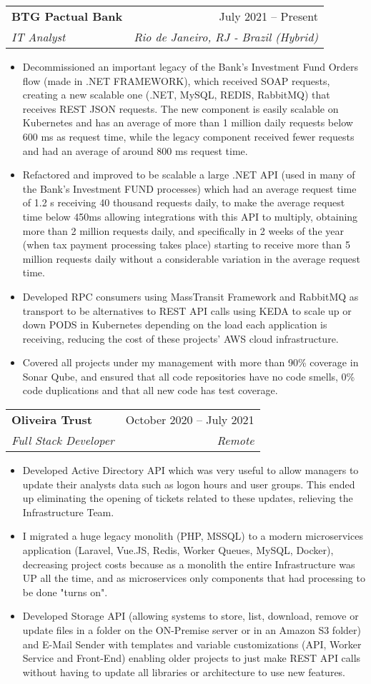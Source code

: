 \documentclass[letterpaper,11pt]{article}
\makeatletter
\newcommand{\resumeItem}[1]{
  \item\small{
    {#1 \vspace{-2pt}}
  }
}
\newcommand{\resumeSubheading}[4]{
  \vspace{-2pt}\item
    \begin{tabular*}{0.97\textwidth}[t]{l@{\extracolsep{\fill}}r}
      \textbf{#1} & #2 \\
      \textit{\small#3} & \textit{\small #4} \\
    \end{tabular*}\vspace{-7pt}
}
\newcommand{\resumeItemListStart}{\begin{itemize}}
\newcommand{\resumeItemListEnd}{\end{itemize}\vspace{-5pt}}
\makeatother
\begin{document}
    \resumeSubheading
      {BTG Pactual Bank}{July 2021 -- Present}
      {IT Analyst}{Rio de Janeiro, RJ - Brazil (Hybrid)}
      \resumeItemListStart
        \resumeItem{Decommissioned an important legacy of the Bank's Investment Fund Orders flow (made in .NET FRAMEWORK), which received SOAP requests, creating a new scalable one (.NET, MySQL, REDIS, RabbitMQ) that receives REST JSON requests. The new component is easily scalable on Kubernetes and has an average of more than 1 million daily requests below 600 ms as request time, while the legacy component received fewer requests and had an average of around 800 ms request time.}
        \resumeItem{Refactored and improved to be scalable a large .NET API (used in many of the Bank's Investment FUND processes) which had an average request time of 1.2 s receiving 40 thousand requests daily, to make the average request time below 450ms allowing integrations with this API to multiply, obtaining more than 2 million requests daily, and specifically in 2 weeks of the year (when tax payment processing takes place) starting to receive more than 5 million requests daily without a considerable variation in the average request time.}
        \resumeItem{Developed RPC consumers using MassTransit Framework and RabbitMQ as transport to be alternatives to REST API calls using KEDA to scale up or down PODS in Kubernetes depending on the load each application is receiving, reducing the cost of these projects' AWS cloud infrastructure.}
        \resumeItem{Covered all projects under my management with more than 90\% coverage in Sonar Qube, and ensured that all code repositories have no code smells, 0\% code duplications and that all new code has test coverage.}
      \resumeItemListEnd


    \resumeSubheading
      {Oliveira Trust}{October 2020 -- July 2021}
      {Full Stack Developer}{Remote}
      \resumeItemListStart
        \resumeItem{Developed Active Directory API which was very useful to allow managers to update their analysts data such as logon hours and user groups. This ended up eliminating the opening of tickets related to these updates, relieving the Infrastructure Team.}
        \resumeItem{I migrated a huge legacy monolith (PHP, MSSQL) to a modern microservices application (Laravel, Vue.JS, Redis, Worker Queues, MySQL, Docker), decreasing project costs because as a monolith the entire Infrastructure was UP all the time, and as microservices only components that had processing to be done "turns on".}
        \resumeItem{Developed Storage API (allowing systems to store, list, download, remove or update files in a folder on the ON-Premise server or in an Amazon S3 folder) and E-Mail Sender with templates and variable customizations (API, Worker Service and Front-End) enabling older projects to just make REST API calls without having to update all libraries or architecture to use new features.}
      \resumeItemListEnd
\end{document}
